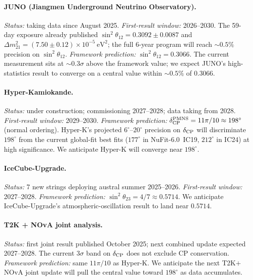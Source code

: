 \documentclass[reprint,amsmath,amssymb,aps,prd,longbibliography,floatfix]{revtex4-2}
\begin{document}
\paragraph{JUNO (Jiangmen Underground Neutrino Observatory).}
\emph{Status:} taking data since August 2025. \emph{First-result
window:} 2026--2030. The 59-day exposure already published
$\sin^2\theta_{12} = 0.3092 \pm 0.0087$ and
$\Delta m_{21}^2 = (7.50\pm 0.12)\times 10^{-5}~\mathrm{eV}^2$;
the full 6-year program will reach $\sim\!0.5\%$ precision on
$\sin^2\theta_{12}$. \emph{Framework prediction:}
$\sin^2\theta_{12} = 0.3066$. The current measurement sits at
$\sim\!0.3\sigma$ above the framework value; we expect JUNO's
high-statistics result to converge on a central value within
$\sim\!0.5\%$ of $0.3066$.

\paragraph{Hyper-Kamiokande.}
\emph{Status:} under construction; commissioning 2027--2028; data
taking from 2028. \emph{First-result window:} 2029--2030.
\emph{Framework prediction:} $\delta_{\rm CP}^{\rm PMNS} = 11\pi/10
\approx 198^\circ$ (normal ordering). Hyper-K's projected $6^\circ$--$20^\circ$
precision on $\delta_{\rm CP}$ will discriminate $198^\circ$ from
the current global-fit best fits ($177^\circ$ in NuFit-6.0~IC19,
$212^\circ$ in IC24) at high significance. We anticipate Hyper-K
will converge near $198^\circ$.

\paragraph{IceCube-Upgrade.}
\emph{Status:} 7 new strings deploying austral summer 2025--2026.
\emph{First-result window:} 2027--2028. \emph{Framework prediction:}
$\sin^2\theta_{23} = 4/7 \approx 0.5714$. We anticipate
IceCube-Upgrade's atmospheric-oscillation result to land near
$0.5714$.

\paragraph{T2K + NOvA joint analysis.}
\emph{Status:} first joint result published October 2025; next
combined update expected 2027--2028. The current $3\sigma$ band on
$\delta_{\rm CP}$ does not exclude CP conservation. \emph{Framework
prediction:} same $11\pi/10$ as Hyper-K. We anticipate the next
T2K$+$NOvA joint update will pull the central value toward $198^\circ$
as data accumulates.
\end{document}
